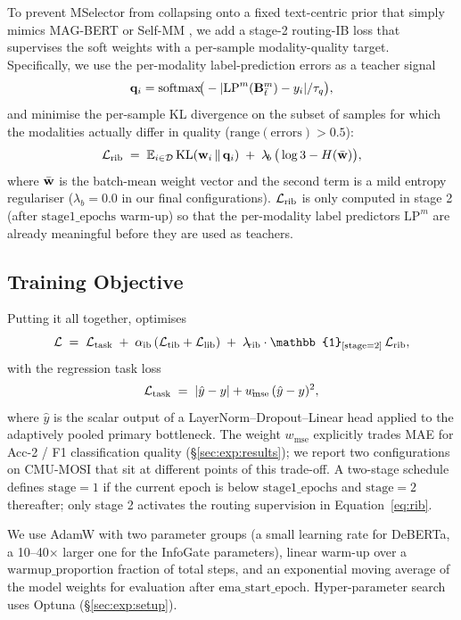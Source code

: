 To prevent MSelector from collapsing onto a fixed text-centric prior
that simply mimics MAG-BERT \citep{rahman2020magbert} or
Self-MM \citep{yu2021selfmm}, we add a stage-2 routing-IB loss that
supervises the soft weights with a per-sample modality-quality target.
Specifically, we use the per-modality label-prediction errors as a
teacher signal
\begin{equation}
  \mathbf{q}_{i} = \mathrm{softmax}\!\big(-|\mathrm{LP}^{m}(\mathbf{B}^{m}_{\bar{t}})-y_{i}|/\tau_{q}\big),
\end{equation}
and minimise the per-sample KL divergence on the subset of samples for
which the modalities actually differ in quality
($\mathrm{range}(\text{errors}) > 0.5$):
\begin{equation}
  \mathcal{L}_{\text{rib}} \;=\; \mathbb{E}_{i\in\mathcal{D}}\,\mathrm{KL}(\mathbf{w}_{i}\,\Vert\,\mathbf{q}_{i}) \;+\; \lambda_{\!b}\,\big(\log 3 - H(\bar{\mathbf{w}})\big),
  \label{eq:rib}
\end{equation}
where $\bar{\mathbf{w}}$ is the batch-mean weight vector and the second
term is a mild entropy regulariser ($\lambda_{\!b}\!=\!0.0$ in our final
configurations).
$\mathcal{L}_{\text{rib}}$ is only computed in stage 2 (after $\mathrm{stage1\_epochs}$
warm-up) so that the per-modality label predictors $\mathrm{LP}^{m}$ are
already meaningful before they are used as teachers.

\subsection{Training Objective}
\label{sec:method:loss}

Putting it all together, \methodname{} optimises
\begin{equation}
  \mathcal{L} \;=\; \Lvtask \;+\; \alpha_{\mathrm{ib}}\,(\Lvtib+\Lvlib) \;+\; \lambda_{\!\mathrm{rib}}\cdot \mathbb{1}_{[\text{stage}=2]}\,\Lvrib,
  \label{eq:total}
\end{equation}
with the regression task loss
\begin{equation}
  \mathcal{L}_{\text{task}} \;=\; |\hat y-y| + w_{\!\mathrm{mse}}\,(\hat y-y)^{2},
  \label{eq:task}
\end{equation}
where $\hat y$ is the scalar output of a LayerNorm--Dropout--Linear head
applied to the adaptively pooled primary bottleneck.
The weight $w_{\!\mathrm{mse}}$ explicitly trades MAE for Acc-2 / F1
classification quality (\S\ref{sec:exp:results}); we report two
configurations on \textsc{CMU-MOSI} that sit at different points of this
trade-off.
A two-stage schedule defines $\text{stage}=1$ if the current epoch is
below $\mathrm{stage1\_epochs}$ and $\text{stage}=2$ thereafter; only
stage 2 activates the routing supervision in
Equation~\eqref{eq:rib}.

We use AdamW \citep{loshchilov2019adamw,kingma2015adam} with two
parameter groups (a small learning rate for DeBERTa, a 10--40$\times$
larger one for the InfoGate parameters), linear warm-up over a
$\mathrm{warmup\_proportion}$ fraction of total steps, and an
exponential moving average of the model weights for evaluation after
$\mathrm{ema\_start\_epoch}$.
Hyper-parameter search uses Optuna \citep{akiba2019optuna}
(\S\ref{sec:exp:setup}).
